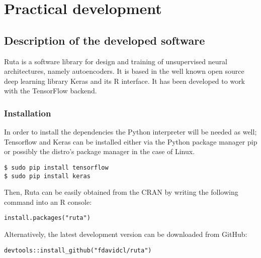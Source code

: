 \documentclass[oneside,openright,titlepage,numbers=noenddot,openany,headinclude,footinclude=true,
cleardoublepage=empty,abstractoff,BCOR=5mm,paper=a4,fontsize=12pt,main=spanish]{scrreprt}
\begin{document}



\part{Practical development}
\label{p.practice}

\chapter{Description of the developed software}

Ruta is a software library for design and training of unsupervised neural architectures, namely autoencoders. It is based in the well known open source deep learning library Keras \cite{Keras} and its R interface. It has been developed to work with the TensorFlow \cite{Tensorflow} backend.

\section{Installation}

In order to install the dependencies the Python interpreter will be needed as well; Tensorflow and Keras can be installed either via the Python package manager pip or possibly the distro’s package manager in the case of Linux.
\begin{verbatim}
$ sudo pip install tensorflow
$ sudo pip install keras
\end{verbatim}

Then,  Ruta can be easily obtained from the CRAN by writing the following command into an R console:
\begin{verbatim}
install.packages("ruta")  
\end{verbatim}

Alternatively, the latest development version can be downloaded from GitHub:
\begin{verbatim}
devtools::install_github("fdavidcl/ruta")
\end{verbatim}
\end{document}
